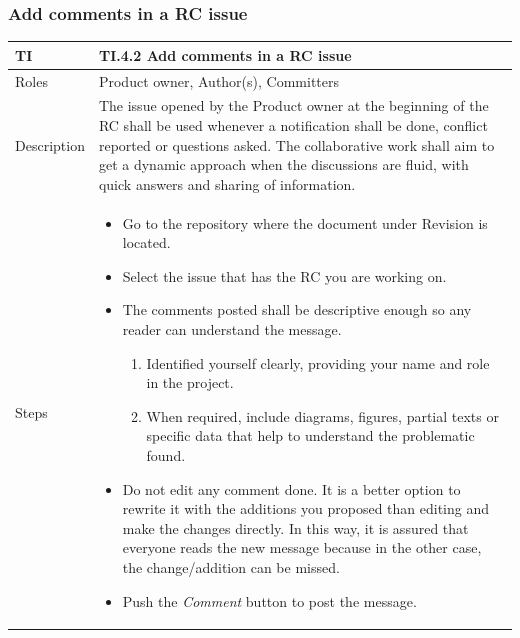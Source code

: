 \documentclass{template/openetcs_article}
\begin{document}
\subsubsection{Add comments in a RC issue}

\begin{flushleft}
\tablefirsthead{}
\tablehead{}
\tabletail{}
\tablelasttail{}
\begin{supertabular}{|m{2cm}|m{13cm}|}
\hline
{}
TI & 
TI.4.2 Add comments in a RC issue
\\\hline
Roles &
Product owner, Author(s), Committers
\\\hline
Description &
The issue opened by the Product owner at the beginning of the RC shall be used whenever a notification shall be done, conflict reported or questions asked. The collaborative work shall aim to get a dynamic approach when the discussions are fluid, with quick answers and sharing of information.
\\\hline
Steps &
\begin{itemize}
\item Go to the repository where the document under Revision is located.
\item Select the issue that has the RC you are working on.
\item The comments posted shall be descriptive enough so any reader can understand the message. 
\begin{enumerate}
\item Identified yourself clearly, providing your name and role in the project.
\item When required, include diagrams, figures, partial texts or specific data that help to understand the problematic found.
\end{enumerate}
\item Do not edit any comment done. It is a better option to rewrite it with the additions you proposed than editing and make the changes directly. In this way, it is assured that everyone reads the new message because in the other case, the change/addition can be missed.
\item Push the {\it Comment} button to post the message.
\end{itemize}

\\\hline
\end{supertabular}
\end{flushleft}
\end{document}

